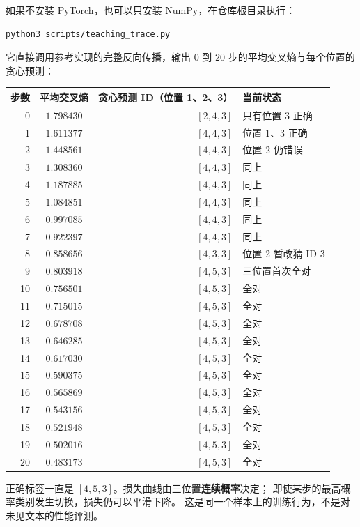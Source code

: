 如果不安装 PyTorch，也可以只安装 NumPy，在仓库根目录执行：
\begin{verbatim}
python3 scripts/teaching_trace.py
\end{verbatim}
它直接调用参考实现的完整反向传播，输出
$0$ 到 $20$ 步的平均交叉熵与每个位置的贪心预测：
\begin{center}\small\renewcommand{\arraystretch}{1.0}
\begin{tabularx}{\linewidth}{@{}rcrX@{}}
\toprule
步数 & 平均交叉熵 & 贪心预测 ID（位置 1、2、3） & 当前状态\\\midrule
0 & $1.798430$ & $[2,4,3]$ & 只有位置 3 正确\\
1 & $1.611377$ & $[4,4,3]$ & 位置 1、3 正确\\
2 & $1.448561$ & $[4,4,3]$ & 位置 2 仍错误\\
3 & $1.308360$ & $[4,4,3]$ & 同上\\
4 & $1.187885$ & $[4,4,3]$ & 同上\\
5 & $1.084851$ & $[4,4,3]$ & 同上\\
6 & $0.997085$ & $[4,4,3]$ & 同上\\
7 & $0.922397$ & $[4,4,3]$ & 同上\\
8 & $0.858656$ & $[4,3,3]$ & 位置 2 暂改猜 ID 3\\
9 & $0.803918$ & $[4,5,3]$ & 三位置首次全对\\
10 & $0.756501$ & $[4,5,3]$ & 全对\\
11 & $0.715015$ & $[4,5,3]$ & 全对\\
12 & $0.678708$ & $[4,5,3]$ & 全对\\
13 & $0.646285$ & $[4,5,3]$ & 全对\\
14 & $0.617030$ & $[4,5,3]$ & 全对\\
15 & $0.590375$ & $[4,5,3]$ & 全对\\
16 & $0.565869$ & $[4,5,3]$ & 全对\\
17 & $0.543156$ & $[4,5,3]$ & 全对\\
18 & $0.521948$ & $[4,5,3]$ & 全对\\
19 & $0.502016$ & $[4,5,3]$ & 全对\\
20 & $0.483173$ & $[4,5,3]$ & 全对\\
\bottomrule
\end{tabularx}
\end{center}
正确标签一直是 $[4,5,3]$。损失曲线由三位置\textbf{连续概率}决定；
即使某步的最高概率类别发生切换，损失仍可以平滑下降。
这是同一个样本上的训练行为，不是对未见文本的性能评测。


